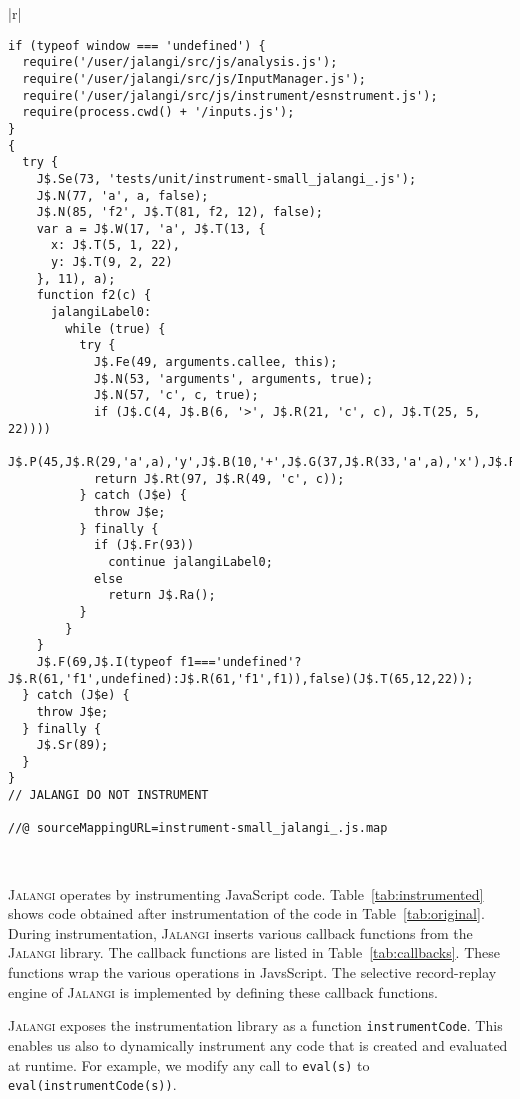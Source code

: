 \documentclass{sig-alternate}
\def\jalangi{\textsc{Jalangi}}
\begin{document}
\begin{table*}
\begin{tabular}{|r|}
\hline\\
{\scriptsize
\begin{lstlisting}
if (typeof window === 'undefined') {
  require('/user/jalangi/src/js/analysis.js');
  require('/user/jalangi/src/js/InputManager.js');
  require('/user/jalangi/src/js/instrument/esnstrument.js');
  require(process.cwd() + '/inputs.js');
}
{
  try {
    J$.Se(73, 'tests/unit/instrument-small_jalangi_.js');
    J$.N(77, 'a', a, false);
    J$.N(85, 'f2', J$.T(81, f2, 12), false);
    var a = J$.W(17, 'a', J$.T(13, {
      x: J$.T(5, 1, 22),
      y: J$.T(9, 2, 22)
    }, 11), a);
    function f2(c) {
      jalangiLabel0:
        while (true) {
          try {
            J$.Fe(49, arguments.callee, this);
            J$.N(53, 'arguments', arguments, true);
            J$.N(57, 'c', c, true);
            if (J$.C(4, J$.B(6, '>', J$.R(21, 'c', c), J$.T(25, 5, 22))))
              J$.P(45,J$.R(29,'a',a),'y',J$.B(10,'+',J$.G(37,J$.R(33,'a',a),'x'),J$.R(41,'c',c)));
            return J$.Rt(97, J$.R(49, 'c', c));
          } catch (J$e) {
            throw J$e;
          } finally {
            if (J$.Fr(93))
              continue jalangiLabel0;
            else
              return J$.Ra();
          }
        }
    }
    J$.F(69,J$.I(typeof f1==='undefined'?J$.R(61,'f1',undefined):J$.R(61,'f1',f1)),false)(J$.T(65,12,22));
  } catch (J$e) {
    throw J$e;
  } finally {
    J$.Sr(89);
  }
}
// JALANGI DO NOT INSTRUMENT

//@ sourceMappingURL=instrument-small_jalangi_.js.map
\end{lstlisting}
}\\
\hline
\end{tabular}
\caption{After Instrumentation of  Code in Table~\ref{tab:original}}
\label{tab:instrumented}
\end{table*}

\jalangi{} operates by instrumenting JavaScript code.
Table~\ref{tab:instrumented} shows code obtained after instrumentation
of the code in Table~\ref{tab:original}.  During instrumentation,
\jalangi{} inserts various callback functions from the \jalangi{}
library.  The callback functions are listed in
Table~\ref{tab:callbacks}.  These functions wrap the various
operations in JavsScript.  The selective record-replay engine of
\jalangi{} is implemented by defining these callback functions.

\jalangi{} exposes the instrumentation library as a function
\texttt{instrumentCode}.  This enables us also to dynamically
instrument any code that is created and evaluated at runtime.  For
example, we modify any call to \texttt{eval(s)} to
\texttt{eval(instrumentCode(s))}.
\end{document}
